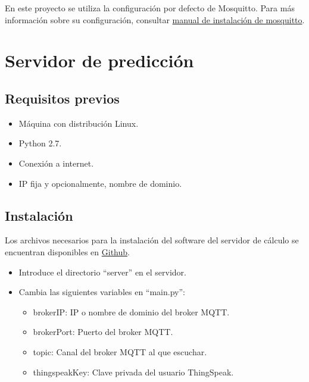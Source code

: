 En este proyecto se utiliza la configuración por defecto de Mosquitto. Para más información sobre su configuración, consultar \href{https://www.digitalocean.com/community/tutorials/how-to-install-and-secure-the-mosquitto-mqtt-messaging-broker-on-ubuntu-16-04}{manual de instalación de mosquitto}.

\section{Servidor de predicción}
\label{makereference8.4}

\subsection{Requisitos previos}
\label{makereference8.4.1}

\begin{itemize}
\item Máquina con distribución Linux.
\item Python 2.7.
\item Conexión a internet.
\item IP fija y opcionalmente, nombre de dominio.
\end{itemize}

\subsection{Instalación}
\label{makereference8.4.2}
Los archivos necesarios para la instalación del software del servidor de cálculo se encuentran disponibles en \href{https://github.com/MrSlide22/TFG/server}{Github}.

\begin{itemize}
	\item Introduce el directorio ``server'' en el servidor.
	\item Cambia las siguientes variables en ``main.py'':
	\begin{itemize}
	\item brokerIP: IP o nombre de dominio del broker MQTT.
	\item brokerPort: Puerto del broker MQTT.
	\item topic: Canal del broker MQTT al que escuchar.
	\item thingspeakKey: Clave privada del usuario ThingSpeak.
	\end{itemize}
\end{itemize}